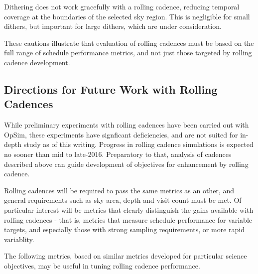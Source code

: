 Dithering does not work gracefully with a rolling cadence, reducing temporal coverage at the boundaries of the selected sky region.  This is negligible for small dithers, but important for large dithers, which are under consideration.

These cautions illustrate that evaluation of rolling cadences must be based on the full range of schedule performance metrics, and not just those targeted by rolling cadence development.

\subsection{ Directions for Future Work with Rolling Cadences}
\label{sec:rolling:directions}

While preliminary experiments with rolling cadences have been carried out with OpSim, these experiments have signficant deficiencies, and are not suited for in-depth study as of this writing.  Progress in rolling cadence simulations is expected no sooner than mid to late-2016. Preparatory to that, analysis of cadences described above can guide development of objectives for enhancement by rolling cadence.  

Rolling cadences will be required to pass the same metrics as an other, and general requirements such as sky area, depth and visit count must be met.  Of particular interest will be metrics that clearly distinguish the gains available with rolling cadences - that is, metrics that measure schedule performance for variable targets, and especially those with strong sampling requirements, or more rapid variablity.

The following metrics, based on similar metrics developed for particular science objectives, may be useful in tuning rolling cadence performance. 

